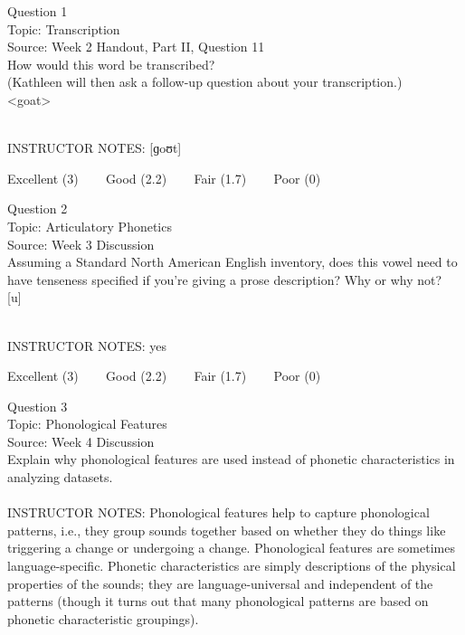 \documentclass[12pt]{article}
\begin{document}
\begin{center}
\textbf{{\color{blue}{\HUGE START OF EXAM\\}}}

\textbf{{\color{blue}{\HUGE Student ID: 28926\\}}}

\textbf{{\color{blue}{\HUGE \\}}}

\end{center}
\newpage

{\large Question 1}\\

Topic: Transcription\\
Source: Week 2 Handout, Part II, Question 11\\

How would this word be transcribed?\\ (Kathleen will then ask a follow-up question about your transcription.)\\

<goat>


~\\
INSTRUCTOR NOTES: [ɡoʊt]


\vfill
Excellent (3) ~~~ Good (2.2) ~~~ Fair (1.7) ~~~ Poor (0)
\newpage

{\large Question 2}\\

Topic: Articulatory Phonetics\\
Source: Week 3 Discussion\\

Assuming a Standard North American English inventory, does this vowel need to have tenseness specified if you're giving a prose description? Why or why not?\\

{[u]}


~\\
INSTRUCTOR NOTES: yes


\vfill
Excellent (3) ~~~ Good (2.2) ~~~ Fair (1.7) ~~~ Poor (0)
\newpage

{\large Question 3}\\

Topic: Phonological Features\\
Source: Week 4 Discussion\\

Explain why phonological features are used instead of phonetic characteristics in analyzing datasets.\\


~\\
INSTRUCTOR NOTES: Phonological features help to capture phonological patterns, i.e., they group sounds together based on whether they do things like triggering a change or undergoing a change. Phonological features are sometimes language-specific. Phonetic characteristics are simply descriptions of the physical properties of the sounds; they are language-universal and independent of the patterns (though it turns out that many phonological patterns are based on phonetic characteristic groupings).
\end{document}
